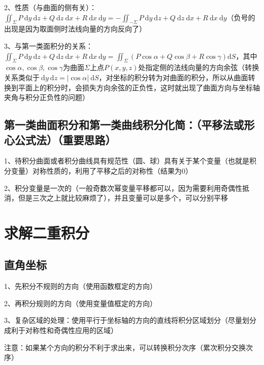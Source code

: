 2、性质（与曲面的侧有关）：$\iint_{\Sigma} P \mathrm{~d} y \mathrm{~d} z+Q \mathrm{~d} z \mathrm{~d} x+R \mathrm{~d} x \mathrm{~d} y=-\iint_{-\Sigma} P \mathrm{~d} y \mathrm{~d} z+Q \mathrm{~d} z \mathrm{~d} x+R \mathrm{~d} x \mathrm{~d} y$（负号的出现是因为取面侧时法线向量的方向反向了）

3、与第一类面积分的关系：$\iint_{\Sigma} P \mathrm{~d} y \mathrm{~d} z+Q \mathrm{~d} z \mathrm{~d} x+R \mathrm{~d} x \mathrm{~d} y=\iint_{\Sigma}(P \cos \alpha+Q \cos \beta+R \cos \gamma) \mathrm{d} S$，其中$\cos \alpha, \cos \beta, \cos \gamma$为曲面$\Sigma$上点$P(x, y, z)$处指定侧的法线向量的方向余弦（转换关系类似于$\mathrm{~d} y \mathrm{~d} z = |\cos \alpha| \ \mathrm{d} S$，对坐标的积分转为对曲面的积分，所以从曲面转换到平面上的积分时，会损失方向余弦的正负性，这时就出现了曲面方向与坐标轴夹角与积分正负性的问题）



\subsection{第一类曲面积分和第一类曲线积分化简：（平移法或形心公式法）（重要思路）}

1、待积分曲面或者积分曲线具有规范性（圆、球）具有关于某个变量（也就是积分变量）对称性质的，利用了平移之后的对称性（结果为0）

2、积分变量是一次的（一般奇数次幂变量平移都可以，因为需要利用奇偶性抵消，但是三次之上就比较麻烦了），并且变量可以是多个，可以分别平移

\section{求解二重积分}



\subsection{直角坐标}

1、先积分不规则的方向（使用函数框定的方向）

2、再积分规则的方向（使用变量值框定的方向）

3、复杂区域的处理：使用平行于坐标轴的方向的直线将积分区域划分（尽量划分成利于对称性和奇偶性应用的区域）

注意：如果某个方向的积分不利于求出来，可以转换积分次序（累次积分交换次序）



